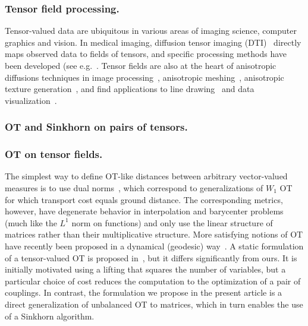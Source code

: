\subsubsection{Tensor field processing.}

Tensor-valued data are ubiquitous in various areas of imaging science, computer graphics and vision. In medical imaging, diffusion tensor imaging (DTI)~\cite{wandell2016clarifying} directly maps observed data to fields of tensors, and specific processing methods have been developed (see e.g.~\cite{Dryden2009,Deriche2006}. Tensor fields are also at the heart of anisotropic diffusions techniques in image processing~\cite{weickert1998anisotropic}, anisotropic meshing~\cite{alliez2003anisotropic,demaret2006image,peyre-iccv-09}, anisotropic texture generation~\cite{LagaImproving}, and find applications to line drawing~\cite{VaxmanCDPBHB16} and data visualization~\cite{HotzFHHJJ04}. 

\subsubsection{OT and Sinkhorn on pairs of tensors.}


\subsubsection{OT on tensor fields.}

The simplest way to define OT-like distances between arbitrary vector-valued measures is to use dual norms~\cite{Ning2014metrics}, which correspond to generalizations of $W_1$ OT for which transport cost equals ground distance. The corresponding metrics, however, have degenerate behavior in interpolation and barycenter problems (much like the $L^1$ norm on functions) and only use the linear structure of matrices rather than their multiplicative structure.
%
More satisfying notions of OT have recently been proposed in a dynamical (geodesic) way~\cite{JiangSpectral,Carlen2014,Chen2016}. 
%
A static formulation of a tensor-valued OT is proposed in~\cite{ning2015matrix}, but it differs significantly from ours. It is initially motivated using a lifting that squares the number of variables, but a particular choice of cost reduces the computation to the optimization of a pair of couplings. In contrast, the formulation we propose in the present article is a direct generalization of unbalanced OT to matrices, which in turn enables the use of a Sinkhorn algorithm. 


